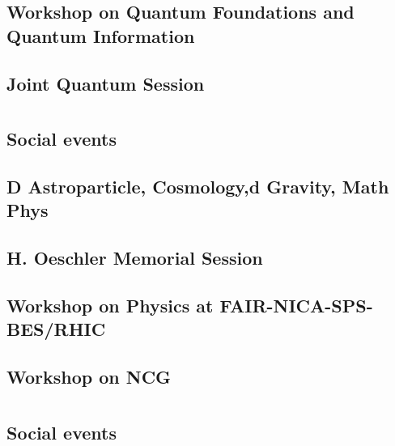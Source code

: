 \subsection{Workshop on Quantum Foundations and Quantum Information}

\clearpage

\subsection{Joint Quantum Session}

\clearpage

\section{}
\subsection{Social events}

\clearpage

\subsection{D Astroparticle, Cosmology,d Gravity, Math Phys}

\clearpage

\subsection{H. Oeschler Memorial Session}

\clearpage

\subsection{Workshop on Physics at FAIR-NICA-SPS-BES/RHIC}

\clearpage

\subsection{Workshop on NCG}

\clearpage

\section{}
\subsection{Social events}

\clearpage

